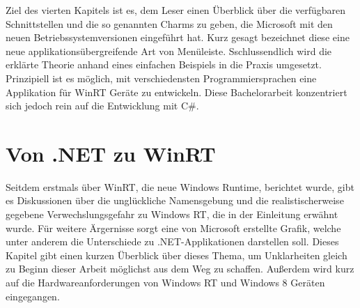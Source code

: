 \documentclass[a4paper,bibtotoc,oneside]{scrbook}
\begin{document}
\newline
\newline
Ziel des vierten Kapitels ist es, dem Leser einen Überblick über die verfügbaren Schnittstellen und die so genannten Charms zu geben, die Microsoft mit den neuen Betriebssystemversionen eingeführt hat. Kurz gesagt bezeichnet diese eine neue applikationsübergreifende Art von Menüleiste.
\newline
\newline
Sschlussendlich wird die erklärte Theorie anhand eines einfachen Beispiels in die Praxis umgesetzt.
\newline
\newline
Prinzipiell ist es möglich, mit verschiedensten Programmiersprachen eine Applikation für WinRT Geräte zu entwickeln. Diese Bachelorarbeit konzentriert sich jedoch rein auf die Entwicklung mit C\#.


\chapter[Von .NET zu WinRT]{Von .NET zu WinRT}

Seitdem erstmals über WinRT, die neue Windows Runtime, berichtet wurde, gibt es Diskussionen über die unglückliche Namensgebung und die realistischerweise gegebene Verwechslungsgefahr zu Windows RT, die in der Einleitung erwähnt wurde. 
\newline
Für weitere Ärgernisse sorgt eine von Microsoft erstellte Grafik, welche unter anderem die Unterschiede zu .NET-Applikationen darstellen soll. Dieses Kapitel gibt einen kurzen Überblick über dieses Thema, um Unklarheiten gleich zu Beginn dieser Arbeit möglichst aus dem Weg zu schaffen.
\newline
Außerdem wird kurz auf die Hardwareanforderungen von Windows RT und Windows 8 Geräten eingegangen.
\end{document}
